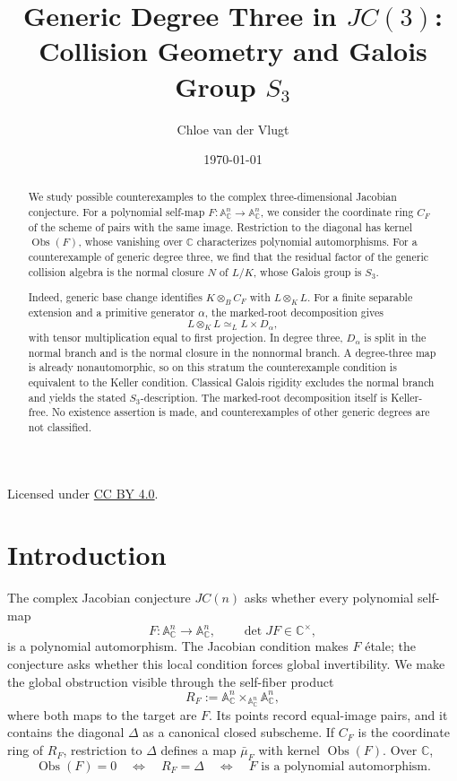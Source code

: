 \documentclass[11pt]{article}
\title{Generic Degree Three in \(JC(3)\): Collision Geometry and Galois Group \(S_3\)}
\author{Chloe van der Vlugt}
\date{\today}
\theoremstyle{remark}
\theoremstyle{definition}
\newcommand{\A}{\mathbb A}
\newcommand{\C}{\mathbb C}
\newcommand{\Obs}{\operatorname{Obs}}
\begin{document}
\maketitle

\begin{abstract}
We study possible counterexamples to the complex three-dimensional
Jacobian conjecture.  For a polynomial self-map
\(F\colon\A^n_{\C}\to\A^n_{\C}\), we consider the coordinate ring \(C_F\)
of the scheme of pairs with the same image.  Restriction to the diagonal
has kernel \(\Obs(F)\), whose vanishing over \(\C\) characterizes polynomial
automorphisms.  For a counterexample of generic degree three, we find that
the residual factor of the generic collision algebra is the normal closure
\(N\) of \(L/K\), whose Galois group is \(S_3\).

Indeed, generic base change identifies \(K\otimes_BC_F\) with
\(L\otimes_KL\).  For a finite separable extension and a primitive generator
\(\alpha\), the marked-root decomposition gives
\[
  L\otimes_KL\simeq_L L\times D_\alpha,
\]
with tensor multiplication equal to first projection.  In degree three,
\(D_\alpha\) is split in the normal branch and is the normal closure in
the nonnormal branch.  A degree-three map is already nonautomorphic, so on
this stratum the counterexample condition is equivalent to the Keller
condition.  Classical Galois rigidity excludes the normal branch and yields
the stated \(S_3\)-description.  The marked-root decomposition itself is
Keller-free.  No existence assertion is made, and counterexamples of other
generic degrees are not classified.
\end{abstract}

\begin{center}
  \small Licensed under
  \href{https://creativecommons.org/licenses/by/4.0/}
    {CC BY 4.0}.
\end{center}

\tableofcontents

\section{Introduction}
\label{sec:introduction}

The complex Jacobian conjecture \(JC(n)\) asks whether every polynomial
self-map
\[
  F\colon\A^n_{\C}\longrightarrow\A^n_{\C},
  \qquad \det JF\in\C^\times,
\]
is a polynomial automorphism.  The Jacobian condition makes \(F\)
\'etale; the conjecture asks whether this local condition forces global
invertibility.  We make the global obstruction visible through the
self-fiber product
\[
  R_F:=\A^n_{\C}\times_{\A^n_{\C}}\A^n_{\C},
\]
where both maps to the target are \(F\).  Its points record equal-image
pairs, and it contains the diagonal \(\Delta\) as a canonical closed
subscheme.  If \(C_F\) is the coordinate ring of \(R_F\), restriction to
\(\Delta\) defines a map \(\bar\mu_F\) with kernel \(\Obs(F)\).  Over
\(\C\),
\[
  \Obs(F)=0
  \quad\Longleftrightarrow\quad
  R_F=\Delta
  \quad\Longleftrightarrow\quad
  F\text{ is a polynomial automorphism}.
\]
\end{document}
